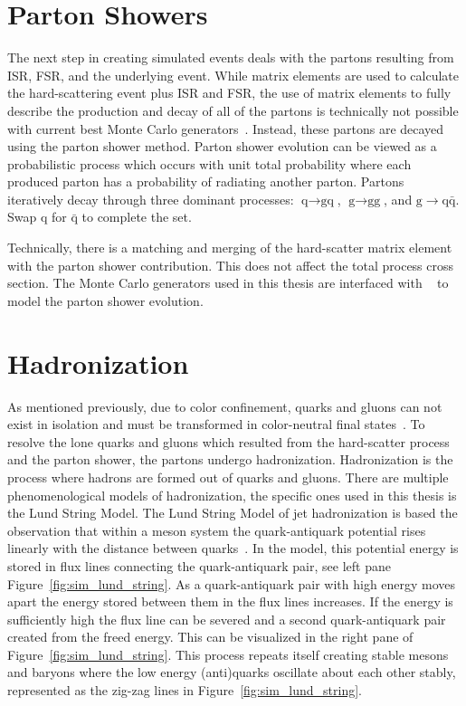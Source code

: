 \section{Parton Showers}
The next step in creating simulated events deals with the partons resulting from ISR,
FSR, and the underlying event. 
While matrix elements are used to calculate the hard-scattering event plus ISR and FSR, 
the use of matrix elements to fully describe the production and decay of all of the
partons is technically not possible with current best Monte Carlo generators~\cite{PhysRevD.94.074005}. 
Instead, these partons are decayed using the parton shower method. 
Parton shower evolution can be viewed as a probabilistic process 
which occurs with unit total probability where each produced parton has a probability
of radiating another parton. Partons iteratively decay through three 
dominant processes: $\textrm{q} \to \textrm{gq}$, $\textrm{g} \to \textrm{gg}$, 
and $\textrm{g} \to \textrm{q}\bar{\textrm{q}}$. Swap $\textrm{q}$ for $\bar{\textrm{q}}$
to complete the set. 

Technically, there is a matching and merging of the hard-scatter matrix element with the
parton shower contribution. This does not affect the total process cross section.
The Monte Carlo generators used in this thesis are interfaced with 
~\cite{Sjostrand:2014zea} to model the parton shower evolution.



\section{Hadronization}
As mentioned previously, due to color confinement, quarks and gluons can not exist in isolation
and must be transformed in color-neutral final states~\cite{Hoche:2014rga}. 
To resolve the lone quarks and gluons which resulted from the hard-scatter process and the parton 
shower, the partons undergo hadronization. Hadronization is the process where hadrons are formed 
out of quarks and gluons. There are multiple phenomenological models of hadronization, the
specific ones used in this thesis is the Lund String Model. The Lund String Model of jet
hadronization is based the observation that within a meson system the quark-antiquark 
potential rises linearly with the distance between quarks~\cite{Bali:1992ab}. In the model, this
potential energy is stored in flux lines connecting the quark-antiquark pair, see left pane 
Figure~\ref{fig:sim_lund_string}. As a quark-antiquark 
pair with high energy moves apart the energy stored between them in the flux lines increases. If the energy
is sufficiently high the flux line can be severed and a second quark-antiquark pair created from
the freed energy. This can be visualized in the right pane of Figure~\ref{fig:sim_lund_string}.
This process repeats itself creating stable mesons and baryons where the low energy (anti)quarks
oscillate about each other stably, represented as the zig-zag lines in Figure~\ref{fig:sim_lund_string}.

